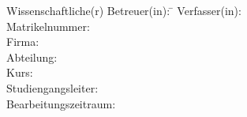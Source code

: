 \begin{titlepage}
\begin{center}
	\begin{minipage}{\textwidth}
		\begin{tabbing}
		Wissenschaftliche(r) Betreuer(in): \hspace{0.85cm}\=\kill
		Verfasser(in): \> \DerAutorDerArbeit \\[1.5mm]
		Matrikelnummer: \> \DieMatrikelnummer \\[1.5mm]
		Firma: \> \DerNameDerFirma  \\[1.5mm]
		Abteilung: \> \DerNameDerAbteilung \\[1.5mm]
		Kurs: \> \DieKursbezeichnung \\[1.5mm]
		Studiengangsleiter: \> \DerStudiengangsleiter \\[1.5mm]
		Bearbeitungszeitraum: \> \DerBearbeitungszeitraum\\[1.5mm]
		\end{tabbing}
	\end{minipage}
\end{center}
\end{titlepage}